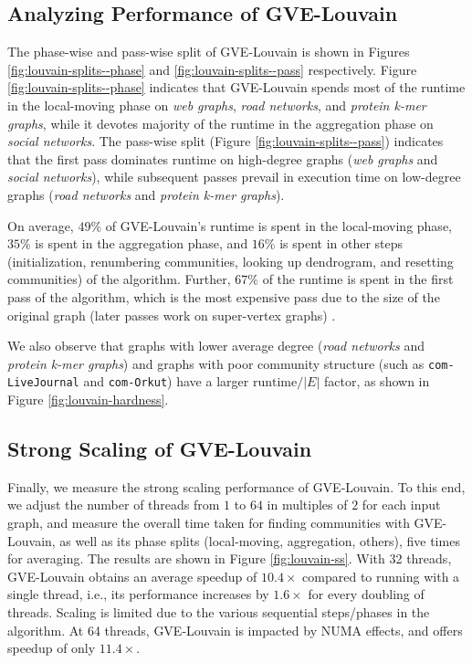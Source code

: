 






\subsection{Analyzing Performance of GVE-Louvain}

The phase-wise and pass-wise split of GVE-Louvain is shown in Figures \ref{fig:louvain-splits--phase} and \ref{fig:louvain-splits--pass} respectively. Figure \ref{fig:louvain-splits--phase} indicates that GVE-Louvain spends most of the runtime in the local-moving phase on \textit{web graphs}, \textit{road networks}, and \textit{protein k-mer graphs}, while it devotes majority of the runtime in the aggregation phase on \textit{social networks}. The pass-wise split (Figure \ref{fig:louvain-splits--pass}) indicates that the first pass dominates runtime on high-degree graphs (\textit{web graphs} and \textit{social networks}), while subsequent passes prevail in execution time on low-degree graphs (\textit{road networks} and \textit{protein k-mer graphs}).

On average, $49\%$ of GVE-Louvain's runtime is spent in the local-moving phase, $35\%$ is spent in the aggregation phase, and $16\%$ is spent in other steps (initialization, renumbering communities, looking up dendrogram, and resetting communities) of the algorithm. Further, $67\%$ of the runtime is spent in the first pass of the algorithm, which is the most expensive pass due to the size of the original graph (later passes work on super-vertex graphs) \cite{com-wickramaarachchi14}.

We also observe that graphs with lower average degree (\textit{road networks} and \textit{protein k-mer graphs}) and graphs with poor community structure (such as \verb|com-LiveJournal| and \verb|com-Orkut|) have a larger $\text{runtime}/|E|$ factor, as shown in Figure \ref{fig:louvain-hardness}.





\subsection{Strong Scaling of GVE-Louvain}

Finally, we measure the strong scaling performance of GVE-Louvain. To this end, we adjust the number of threads from $1$ to $64$ in multiples of $2$ for each input graph, and measure the overall time taken for finding communities with GVE-Louvain, as well as its phase splits (local-moving, aggregation, others), five times for averaging. The results are shown in Figure \ref{fig:louvain-ss}. With 32 threads, GVE-Louvain obtains an average speedup of $10.4\times$ compared to running with a single thread, i.e., its performance increases by $1.6\times$ for every doubling of threads. Scaling is limited due to the various sequential steps/phases in the algorithm. At 64 threads, GVE-Louvain is impacted by NUMA effects, and offers speedup of only $11.4\times$.
